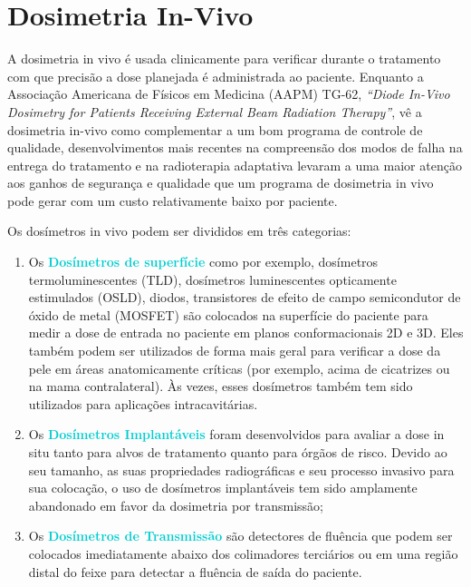 \documentclass[11pt,a4paper]{article}
\newcounter{exemplo}
\begin{document}
\section{Dosimetria In-Vivo}

	A dosimetria in vivo é usada clinicamente para verificar durante o tratamento com que precisão a dose planejada é administrada ao paciente. Enquanto a Associação Americana de Físicos em Medicina (AAPM) TG-62, \textit{``Diode In-Vivo Dosimetry for Patients Receiving External Beam Radiation Therapy''}, vê a dosimetria in-vivo como complementar a um bom programa de controle de qualidade, desenvolvimentos mais recentes na compreensão dos modos de falha na entrega do tratamento e na radioterapia adaptativa levaram a uma maior atenção aos ganhos de segurança e qualidade que um programa de dosimetria in vivo pode gerar com um custo relativamente baixo por paciente.

	Os dosímetros in vivo podem ser divididos em três categorias:

	\begin{enumerate}
		\item Os \textcolor{DarkTurquoise}{\textbf{Dosímetros de superfície}} como por exemplo, dosímetros termoluminescentes (TLD), dosímetros luminescentes opticamente estimulados (OSLD), diodos, transistores de efeito de campo semicondutor de óxido de metal (MOSFET) são colocados na superfície do paciente para medir a dose de entrada no paciente em planos conformacionais 2D e 3D. Eles também podem ser utilizados de forma mais geral para verificar a dose da pele em áreas anatomicamente críticas (por exemplo, acima de cicatrizes ou na mama contralateral). Às vezes, esses dosímetros também tem sido utilizados para aplicações intracavitárias.
		
		\item Os \textcolor{DarkTurquoise}{\textbf{Dosímetros Implantáveis}} foram desenvolvidos para avaliar a dose in situ tanto para alvos de tratamento quanto para órgãos de risco. Devido ao seu tamanho, as suas propriedades radiográficas e seu processo invasivo para sua colocação, o uso de dosímetros implantáveis tem sido amplamente abandonado em favor da dosimetria por transmissão;
		
		\item Os \textcolor{DarkTurquoise}{\textbf{Dosímetros de Transmissão}} são detectores de fluência que podem ser colocados imediatamente abaixo dos colimadores terciários ou em uma região distal do feixe para detectar a fluência de saída do paciente. 
	\end{enumerate}
\end{document}
